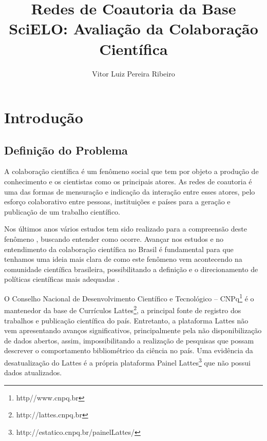 \documentclass[12pt]{article}
\title{Redes de Coautoria da Base SciELO: Avaliação da Colaboração Científica}
\author{Vitor Luiz Pereira Ribeiro}
\begin{document}
 

\maketitle

  
     
  


\section{Introdução}

\subsection{\textbf{Definição do Problema}}

A colaboração científica é um fenômeno social que tem  por objeto a produção de conhecimento e os cientistas como os principais atores. As redes de coautoria é uma das formas de mensuração e indicação da interação entre esses atores, pelo esforço colaborativo entre pessoas, instituições e países para a geração e publicação de um trabalho científico.

Nos últimos anos vários estudos tem sido realizado para a compreensão deste fenômeno \citep{Maia2008}, buscando entender como ocorre. 
Avançar nos estudos e no entendimento da colaboração científica no Brasil é fundamental para que tenhamos uma ideia mais clara de como este fenômeno vem acontecendo na comunidade científica brasileira, possibilitando a definição e o direcionamento de políticas científicas mais adequadas \cite{Vanz2010}.

O Conselho Nacional de Desenvolvimento Científico e Tecnológico -- CNPq\footnote{http//www.cnpq.br} é o mantenedor da base de Currículos Lattes\footnote{http://lattes.cnpq.br}, a principal fonte de registro dos trabalhos e publicação científica do país. 
Entretanto, a plataforma Lattes não vem apresentando avanços significativos, principalmente pela não disponibilização de dados abertos, assim, impossibilitando a realização de pesquisas que possam descrever o comportamento bibliométrico da ciência no país.
Uma evidência da desatualização do Lattes é a própria plataforma Painel Lattes\footnote{http://estatico.cnpq.br/painelLattes/} que não possui dados atualizados.
\end{document}
